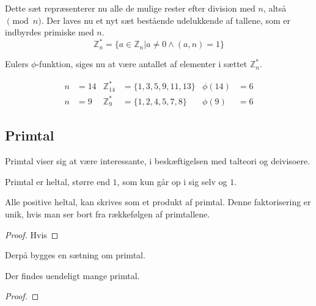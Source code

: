     Dette sæt repræsenterer nu alle de mulige rester efter division med \(n\), altså \(\pmod{n}\).
    Der laves nu et nyt sæt bestående udelukkende af tallene, som er indbyrdes primiske med \(n\).
    \[\mathbb{Z}_n^* = \{a \in \mathbb{Z}_n | a \neq 0 \land (a, n) = 1\}\]

    Eulers \(\phi\)-funktion, siges nu at være antallet af elementer i sættet \(\mathbb{Z}_n^*\).

    \begin{eks}
        \mbox{}\vspace*{-1.5em}
        \begin{align*}
            n &= 14 & \mathbb{Z}_{14}^*  &= \{1, 3, 5, 9, 11, 13 \} & \phi(14) &= 6\\
            n &= 9  & \mathbb{Z}_9^*     &= \{1, 2, 4, 5, 7, 8\}    & \phi(9)  &= 6
        \end{align*}
    \end{eks}






    \subsection{Primtal}
    Primtal viser sig at være interessante, i beskæftigelsen med talteori og deivisoere.

    \begin{definition}[Primtal]
        Primtal er heltal, større end \(1\), som kun går op i sig selv og \(1\).
    \end{definition}




    \begin{sent}
        Alle positive heltal, kan skrives som et produkt af primtal.
        Denne faktorisering er unik, hvis man ser bort fra rækkefølgen af primtallene.
    \end{sent}

    \begin{proof}
        Hvis
    \end{proof}


    Derpå bygges en sætning om primtal.

    \begin{sent}
        Der findes uendeligt mange primtal.
    \end{sent}

    \begin{proof}

    \end{proof}
